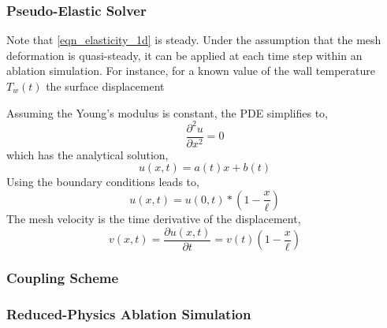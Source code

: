 \subsubsection{Pseudo-Elastic Solver}

Note that \cref{eqn_elasticity_1d} is steady. Under the assumption that the mesh deformation is quasi-steady, it can be applied at each time step within an ablation simulation. For instance, for a known value of the wall temperature $T_w(t)$ the surface displacement 

Assuming the Young's modulus is constant, the PDE simplifies to,
\begin{equation}
    \frac{\partial^2 u}{\partial x^2} = 0
\end{equation}
which has the analytical solution,
\begin{equation}
    u(x,t) = a(t)x + b(t)
\end{equation}
Using the boundary conditions leads to,
\begin{equation}
    u(x,t) = u(0,t) * \left(1 - \frac{x}{\ell}\right)
\end{equation}
The mesh velocity is the time derivative of the displacement,
\begin{equation}
    v(x,t) = \frac{\partial u(x,t)}{\partial t} = v(t)\left(1 - \frac{x}{\ell}\right)
\end{equation}

\subsubsection{Coupling Scheme}

\subsubsection{Reduced-Physics Ablation Simulation}







